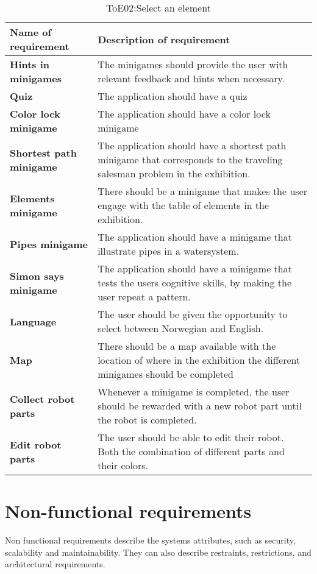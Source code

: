 \begin{table}[H]\label{ref:func_req}
\caption{ToE02:Select an element}
\begin{tabular}{ |p{7cm}|p{7cm}| }
\hline
\textbf {Name of requirement} & {Description of requirement} \\ \hline
\textbf {Hints in minigames} & {The minigames should provide the user with relevant feedback and hints when necessary.} \\ \hline
\textbf {Quiz} & {The application should have a quiz} \\ \hline
\textbf {Color lock minigame} & {The application should have a color lock minigame} \\ \hline
\textbf {Shortest path minigame} & {The application should have a shortest path minigame that corresponds to the traveling salesman problem in the exhibition.} \\ \hline
\textbf {Elements minigame} & {There should be a minigame that makes the user engage with the table of elements in the exhibition.}\\\hline
\textbf{Pipes minigame}&{The application should have a minigame that illustrate pipes in a watersystem.}\\\hline
\textbf{Simon says minigame}&{The application should have a minigame that tests the users cognitive skills, by making the user repeat a pattern.}\\\hline
\textbf{Language}&{The user should be given the opportunity to select between Norwegian and English.}\\\hline
\textbf{Map}&{There should be a map available with the location of where in the exhibition the different minigames should be completed}\\\hline
\textbf{Collect robot parts}&{Whenever a minigame is completed, the user should be rewarded with a new robot part until the robot is completed.}\\\hline
\textbf{Edit robot parts}&{The user should be able to edit their robot. Both the combination of different parts and their colors.}\\\hline
\end{tabular}
\end{table}

\section{Non-functional requirements}
Non functional requirements describe the systems attributes, such as security, scalability and maintainability. They can also describe restraints, restrictions, and architectural requirements\cite{reqtest}.

